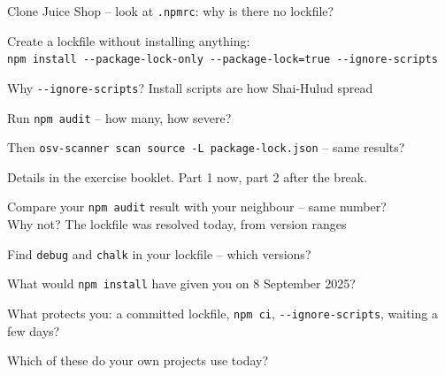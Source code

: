 \documentclass[Screen16to9,17pt]{foils}
\begin{document}

\begin{list2}
\item Clone Juice Shop -- look at \verb+.npmrc+: why is there no lockfile?
\item Create a lockfile without installing anything:\\
{\footnotesize\verb+npm install --package-lock-only --package-lock=true --ignore-scripts+}
\item Why \verb+--ignore-scripts+? Install scripts are how Shai-Hulud spread
\item Run \verb+npm audit+ -- how many, how severe?
\item Then \verb+osv-scanner scan source -L package-lock.json+ -- same results?
\end{list2}

Details in the exercise booklet. Part 1 now, part 2 after the break.

\breakdance



\begin{list2}
\item Compare your \verb+npm audit+ result with your neighbour -- same number?\\
Why not? The lockfile was resolved today, from version ranges
\item Find \verb+debug+ and \verb+chalk+ in your lockfile -- which versions?
\item What would \verb+npm install+ have given you on 8 September 2025?
\item What protects you: a committed lockfile, \verb+npm ci+, \verb+--ignore-scripts+, waiting a few days?
\item Which of these do your own projects use today?
\end{list2}


\end{document}
